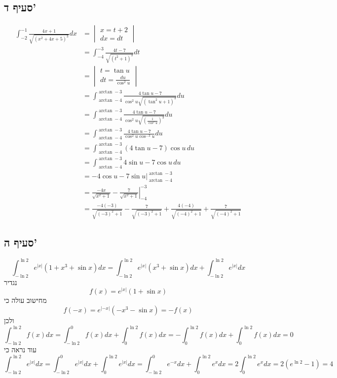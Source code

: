\subsection{סעיף ד'}
\begin{align*}
	\int_{-2}^{-1} \frac{4x + 1}{\sqrt{{(x^2 + 4x + 5)}^3}} dx
	& = \begin{vmatrix}
		x = t + 2 \\
		dx = dt
	\end{vmatrix} \\
	& = \int_{-4}^{-3} \frac{4t - 7}{\sqrt{{(t^2 + 1)}^3}} dt \\
	& = \begin{vmatrix}
		t = \tan u \\
		dt = \frac{du}{\cos^2 u}
	\end{vmatrix} \\
	& = \int_{\arctan -4}^{\arctan -3} \frac{4 \tan u - 7}{\cos^2 u \sqrt{ {(\tan^2 u + 1)}^3}} du \\
	& = \int_{\arctan -4}^{\arctan -3} \frac{4 \tan u - 7}{\cos^2 u \sqrt{ {(\frac{1}{\cos^2 u})}^3}} du \\
	& = \int_{\arctan -4}^{\arctan -3} \frac{4 \tan u - 7}{\cos^2 u \cos^{-3} u} du \\
	& = \int_{\arctan -4}^{\arctan -3} (4 \tan u - 7) \cos u \, du \\
	& = \int_{\arctan -4}^{\arctan -3} 4 \sin u - 7 \cos u \, du \\
	& = \left. -4 \cos u -7 \sin u \right|_{\arctan -4}^{\arctan -3} \\
	& = \left. \frac{-4x}{\sqrt{x^2 + 1}} - \frac{7}{\sqrt{x^2 + 1}} \right|_{-4}^{-3} \\
	& = \frac{-4 (-3)}{\sqrt{{(-3)}^2 + 1}} - \frac{7}{\sqrt{{(-3)}^2 + 1}} + \frac{4 (-4)}{\sqrt{{(-4)}^2 + 1}} + \frac{7}{\sqrt{{(-4)}^2 + 1}}
\end{align*}

\subsection{סעיף ה'}
\[
	\int_{-\ln 2}^{\ln 2} e^{|x|} (1 + x^3 + \sin x) dx
	= \int_{-\ln 2}^{\ln 2} e^{|x|} (x^3 + \sin x) dx
	+ \int_{-\ln 2}^{\ln 2} e^{|x|} dx
\]
נגדיר
\[
	f(x) = e^{|x|} (1 + \sin x)
\]
מחישוב עולה כי
\[
	f(-x) = e^{|-x|} (-x^3 - \sin x) = - f(x)
\]
ולכן
\[
	\int_{-\ln 2}^{\ln 2} f(x) dx
	= \int_{-\ln 2}^{0} f(x) dx + \int_{0}^{\ln 2} f(x) dx
	= -\int_{0}^{\ln 2} f(x) dx + \int_{0}^{\ln 2} f(x) dx
	= 0
\]
עוד נראה כי
\[
	\int_{-\ln 2}^{\ln 2} e^{|x|} dx
	= \int_{-\ln 2}^{0} e^{|x|} dx + \int_{0}^{\ln 2} e^{|x|} dx
	= \int_{-\ln 2}^{0} e^{-x} dx + \int_{0}^{\ln 2} e^{x} dx
	= 2\int_{0}^{\ln 2} e^{x} dx
	= 2 (e^{\ln 2} - 1) = 4
\]



